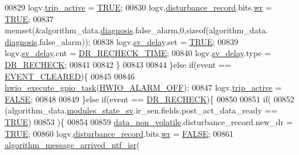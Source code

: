\begin{DoxyCode}
{{{{{00829             logv.\hyperlink{a00021_a32ebd32977bc9831cd68530b2b7ec664}{trip\_active}   = \hyperlink{a00040_aa8cecfc5c5c054d2875c03e77b7be15d}{TRUE};
00830              logv.\hyperlink{a00021_a11ed024c2cc5c53c79b2c0a8b35e3c06}{disturbance\_record}.bits.\hyperlink{a00021_a11ea0eda9ab27873198e7a5c4be4337d}{wr} = \hyperlink{a00040_aa8cecfc5c5c054d2875c03e77b7be15d}{TRUE};
00837             memset(&algorithm\_data.\hyperlink{a00016_a16f85d57ec98b4ad05f5a2e10536b3c6}{diagnosis}.false\_alarm,0,\textcolor{keyword}{sizeof}(algorithm\_data.
      \hyperlink{a00016_a16f85d57ec98b4ad05f5a2e10536b3c6}{diagnosis}.false\_alarm));
00838             logv.\hyperlink{a00021_a854b8f967c206a5f3e4aeaf91a782b3e}{sv\_delay}.set  = \hyperlink{a00040_aa8cecfc5c5c054d2875c03e77b7be15d}{TRUE};
00839             logv.\hyperlink{a00021_a854b8f967c206a5f3e4aeaf91a782b3e}{sv\_delay}.cnt  = \hyperlink{a00021_afb154043998a164232751d1c030e8650}{DR\_RECHECK\_TIME};
00840             logv.\hyperlink{a00021_a854b8f967c206a5f3e4aeaf91a782b3e}{sv\_delay}.type = \hyperlink{a00021_a6e67f9a00e51668436c0395616f43e88}{DR\_RECHECK};
00841 
00842         \}
00843         
00844     \}\textcolor{keywordflow}{else} \textcolor{keywordflow}{if}(event == \hyperlink{a00021_a602c125746b241f3a37e9fd5f43412b0}{EVENT\_CLEARED})\{
00845 
00846           \hyperlink{a00058_a0af9eae455fbdf4e77def5bfffa109cb}{hwio\_execute\_gpio\_task}(\hyperlink{a00058_a17401c2732dee3a19b55a210870b6d8d}{HWIO\_ALARM\_OFF});
00847           logv.\hyperlink{a00021_a32ebd32977bc9831cd68530b2b7ec664}{trip\_active}   = \hyperlink{a00040_aa93f0eb578d23995850d61f7d61c55c1}{FALSE};
00848           
00849     \}\textcolor{keywordflow}{else} \textcolor{keywordflow}{if}(event == \hyperlink{a00021_a6e67f9a00e51668436c0395616f43e88}{DR\_RECHECK})\{
00850                     
00851             \textcolor{keywordflow}{if}(
00852               (algorithm\_data.\hyperlink{a00016_a293140e240bbd54f7601adbc9194148c}{modules\_state\_sv}.ir\_sen.fields.post\_act\_data\_ready == 
      \hyperlink{a00040_aa8cecfc5c5c054d2875c03e77b7be15d}{TRUE})
00853              )\{
00854 
00859            \hyperlink{a00060_a76ac5f917f5308dcd83de0d7c94559fb}{data\_non\_volatile}.disturbance\_record.new\_dr = \hyperlink{a00040_aa8cecfc5c5c054d2875c03e77b7be15d}{TRUE};
00860            logv.\hyperlink{a00021_a11ed024c2cc5c53c79b2c0a8b35e3c06}{disturbance\_record}.bits.\hyperlink{a00021_a11ea0eda9ab27873198e7a5c4be4337d}{wr} = \hyperlink{a00040_aa93f0eb578d23995850d61f7d61c55c1}{FALSE};
00861        \hyperlink{a00038_a85471d58eae93d5d7e7e2b52e2b915d3}{algorithm\_message\_arrived\_ntf\_isr}(
}}}}}
\end{DoxyCode}
